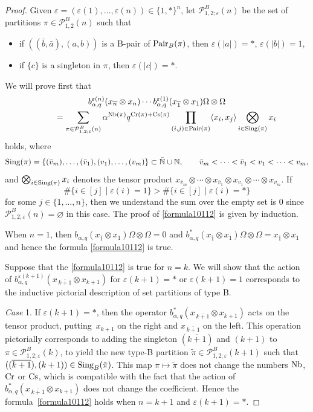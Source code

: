 \documentclass[pdftex]{sigma}
\numberwithin{equation}{section}
\def\N{{\mathbb N}}
\def\B{b_{\s,\q}}
\def\P{\mathcal{P}}
\def\PB{\mathcal{P}^{B}}
\def\Cr{\text{\normalfont Cr}}
\def\InS{\text{\normalfont Cs}}
\def\NB{\text{\normalfont Nb}}
\def\Pair{\text{\normalfont Pair}}
\def\Sing{\text{\normalfont Sing}}
\renewcommand{\epsilon}{\varepsilon}
\newcommand{\q}{q}
\newcommand{\s}{\alpha}%
\begin{document}
\begin{proof}
Given
$\epsilon=(\epsilon(1), \dots, \epsilon(n))\in\{1,\ast\}^{n}$, let
$\P_{1,2;\epsilon}^{B}(n)$ be the set of partitions $\pi\in
\P_{1,2}^{B}(n)$ such that
\begin{itemize}\itemsep=0pt
\item if $((\bar b ,\bar a) , (a,b))$ is a B-pair of
$\Pair_B(\pi)$, then $\epsilon(|a|)= \ast$, $\epsilon(|b|)=1$,
\item if $\{c\}$ is a singleton in $\pi$, then $\epsilon( |c|)=\ast$.
\end{itemize}
We will prove first that
\begin{gather}
\B^{\epsilon(n)}(x_{\overline{n}}\otimes x_{n})\cdots \B^{\epsilon(1)}(x_{\overline{1}}\otimes x_1)\Omega \otimes \Omega \nonumber
\\
\qquad{} = \sum_{\pi\in\PB_{1,2;\epsilon}(n)} \s^{\NB(\pi)}q^{\Cr(\pi)+ \InS(\pi)}
\prod_{\substack{(i,j) \in \Pair(\pi)} }\langle x_i, x_j\rangle
\bigotimes_{i\in \Sing(\pi)} x_i\label{formula10112}
\end{gather}
holds, where
\[
\Sing(\pi) = \{(\bar v_m),\dots,(\bar v_1), (v_1),\dots,(v_m)\} \subset\bar{\N} \cup \N, \qquad
\bar v_m<\cdots < \bar v_1< v_1<\cdots < v_m,
\]
and
$\bigotimes_{i\in \Sing(\pi)} x_i$ denotes the tensor product $x_{\bar v_m}\otimes \cdots \otimes x_{\bar v_1} \otimes x_{v_1}\otimes \cdots \otimes x_{v_m}$.
If
\[
\#\{i\in[j] \mid \epsilon(i)=1\}>\#\{i\in[j] \mid \epsilon(i)=\ast\}
\]
for some $j\in\{1,\dots,n\}$, then we understand the sum over the empty set is 0 since $\PB_{1,2;\epsilon}(n)=\varnothing$ in this case.
The proof of \eqref{formula10112} is given by induction.

When $n=1$, then $\B(x_{\bar 1}\otimes x_1)\Omega\otimes \Omega=0$ and $\B^\ast(x_{\bar 1}\otimes x_1)\Omega\otimes \Omega=x_{\bar 1}\otimes x_1$ and hence the formula \eqref{formula10112} is true.

Suppose that the \eqref{formula10112} is true for $n = k$.
We will show that the action of $\B^{\epsilon(k+1)}(x_{\,\overline{k+1}}{}\otimes x_{k+1})$ for $\epsilon(k+1)=\ast$ or $\epsilon(k+1)=1$ corresponds to the inductive pictorial description of set partitions of type B.

\smallskip\noindent
\emph{Case} 1. If $\epsilon(k+1)=\ast$, then the operator $\B^\ast(x_{\,\overline{k+1}}\otimes x_{k+1})$ acts on the tensor product, putting~$x_{k+1}$ on the right and $x_{\,\overline{k+1}}$ on the left. This operation pictorially corresponds to adding the singleton $(\overline{k+1}
)$ and $(k+1)$ to $\pi\in\PB_{1,2;\epsilon}(k)$, to yield the new type-B partition $\tilde{\pi}\in\PB_{1,2;\epsilon}(k+1)$ such that $((\overline{k+1}), (k+1))\in \Sing_B(\tilde{\pi})$. This map $\pi\mapsto \tilde{\pi} $ does not change the numbers $\NB$, $\Cr$ or $\InS$, which is compatible with the fact that the action of $\B^\ast(x_{\,\overline{k+1}}\otimes x_{k+1})$ does not change the coefficient.
Hence the formula~\eqref{formula10112} holds when $n=k+1$ and $\epsilon(k+1)=\ast$.


\end{proof}
\end{document}
